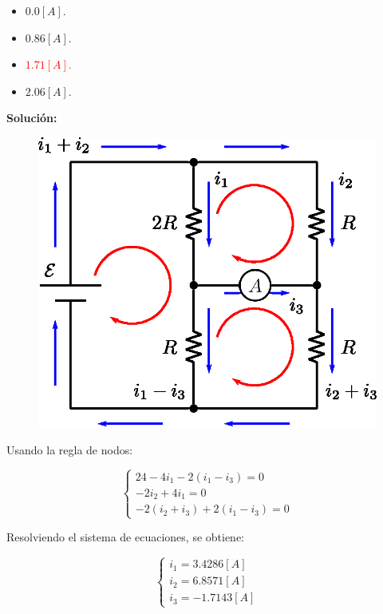 \documentclass[letter,11pt]{article}
\begin{document}
\begin{enumerate}
\begin{itemize}
    \item $0.0  [A]$.
    \item $0.86 [A]$.
    \item \textcolor{red}{$1.71 [A]$.}
    \item $2.06 [A]$.
\end{itemize}

\textbf{Solución:}

\begin{figure}[!h]
\centering
\includegraphics[scale=0.76]{resources/a3.eps}
\end{figure}

Usando la regla de nodos:

\begin{equation*}
    \begin{cases}
        24-4i_1-2(i_1-i_3) = 0 \\
        -2i_2+4i_1 = 0 \\
        -2(i_2+i_3)+2(i_1-i_3) = 0
    \end{cases}
\end{equation*}

Resolviendo el sistema de ecuaciones, se obtiene:

\begin{equation*}
    \begin{cases}
        i_1 = 3.4286 [A] \\
        i_2 = 6.8571 [A] \\
        i_3 = -1.7143 [A]
    \end{cases}
\end{equation*}


\end{enumerate}
\end{document}
